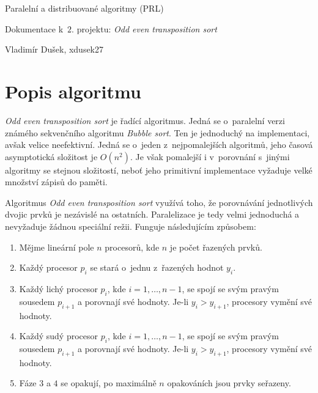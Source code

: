 \documentclass[11pt, a4paper, titlepage]{article}
\begin{document}

\begin{center}
    \Large Paralelní a distribuované algoritmy (PRL)
    \bigskip

    \Large Dokumentace k~$2.$ projektu: \textit{Odd even transposition sort}
    \bigskip

    \Large Vladimír Dušek, xdusek27
    \bigskip
\end{center}


\section{Popis algoritmu}\label{sec:popis}

\textit{Odd even transposition sort} je řadící algoritmus.
Jedná se o~paralelní verzi známého sekvenčního algoritmu \textit{Bubble sort}.
Ten je jednoduchý na implementaci, avšak velice neefektivní.
Jedná se o~jeden z~nejpomalejších algoritmů, jeho časová asymptotická složitost je $O(n^2)$.
Je však pomalejší i v~porovnání s~jinými algoritmy se stejnou složitostí, neboť jeho primitivní implementace vyžaduje velké množství zápisů do paměti.

Algoritmus \textit{Odd even transposition sort} využívá toho, že porovnávání jednotlivých dvojic prvků je nezávislé na ostatních.
Paralelizace je tedy velmi jednoduchá a nevyžaduje žádnou speciální režii.
Funguje následujícím způsobem:

\begin{enumerate}
    \item Mějme lineární pole $n$ procesorů, kde $n$ je počet řazených prvků.
    \item Každý procesor $p_i$ se stará o~jednu z~řazených hodnot $y_i$.
    \item Každý lichý procesor $p_i$, kde $i = 1, \dots, n-1$, se spojí se svým pravým sousedem $p_{i+1}$ a porovnají své hodnoty.
          Je-li $y_i > y_{i+1}$, procesory vymění své hodnoty.
    \item Každý sudý procesor $p_i$, kde $i = 1, \dots, n-1$, se spojí se svým pravým sousedem $p_{i+1}$ a porovnají své hodnoty.
          Je-li $y_i > y_{i+1}$, procesory vymění své hodnoty.
    \item Fáze $3$ a $4$ se opakují, po maximálně $n$ opakováních jsou prvky seřazeny.
\end{enumerate}
\end{document}
